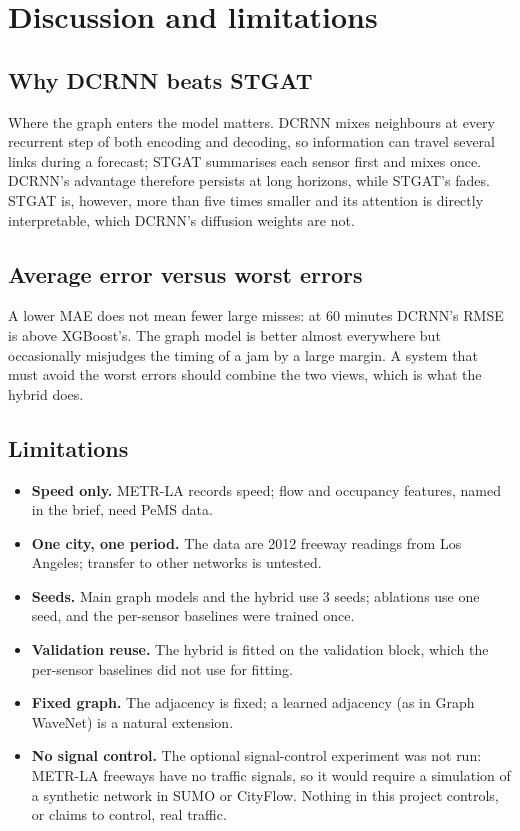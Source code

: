 \documentclass[11pt,a4paper]{article}
\begin{document}
\section{Discussion and limitations}\label{sec:discussion}

\subsection{Why DCRNN beats STGAT}
Where the graph enters the model matters. DCRNN mixes neighbours at every recurrent step of both encoding and decoding,
so information can travel several links during a forecast; STGAT summarises each sensor first and mixes once. DCRNN's
advantage therefore persists at long horizons, while STGAT's fades. STGAT is, however, more than five times smaller and
its attention is directly interpretable, which DCRNN's diffusion weights are not.

\subsection{Average error versus worst errors}
A lower MAE does not mean fewer large misses: at 60 minutes DCRNN's RMSE is above XGBoost's. The graph model is better
almost everywhere but occasionally misjudges the timing of a jam by a large margin. A system that must avoid the worst
errors should combine the two views, which is what the hybrid does.

\subsection{Limitations}\label{sec:limits}
\begin{itemize}
\item \textbf{Speed only.} METR-LA records speed; flow and occupancy features, named in the brief, need PeMS data.
\item \textbf{One city, one period.} The data are 2012 freeway readings from Los Angeles; transfer to other networks is untested.
\item \textbf{Seeds.} Main graph models and the hybrid use 3 seeds; ablations use one seed, and the per-sensor baselines were trained once.
\item \textbf{Validation reuse.} The hybrid is fitted on the validation block, which the per-sensor baselines did not use for fitting.
\item \textbf{Fixed graph.} The adjacency is fixed; a learned adjacency (as in Graph WaveNet) is a natural extension.
\item \textbf{No signal control.} The optional signal-control experiment was not run: METR-LA freeways have no traffic
signals, so it would require a simulation of a synthetic network in SUMO or CityFlow. Nothing in this project controls,
or claims to control, real traffic.
\end{itemize}
\end{document}
